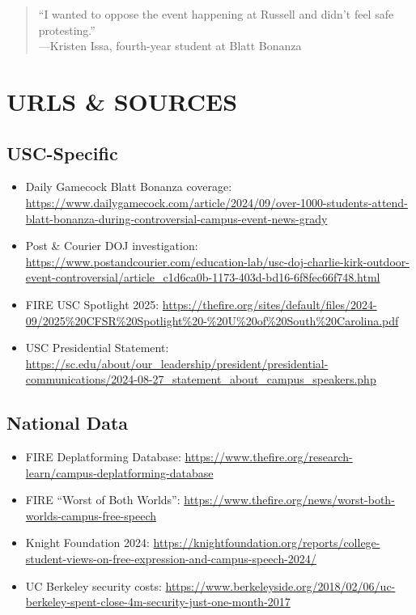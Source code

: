 \documentclass[11pt,letterpaper]{article}
\begin{document}
\begin{quote}
``I wanted to oppose the event happening at Russell and didn't feel safe protesting.''\\
---Kristen Issa, fourth-year student at Blatt Bonanza
\end{quote}

\section{URLS \& SOURCES}

\subsection{USC-Specific}
\begin{itemize}[noitemsep]
    \item Daily Gamecock Blatt Bonanza coverage: \url{https://www.dailygamecock.com/article/2024/09/over-1000-students-attend-blatt-bonanza-during-controversial-campus-event-news-grady}
    \item Post \& Courier DOJ investigation: \url{https://www.postandcourier.com/education-lab/usc-doj-charlie-kirk-outdoor-event-controversial/article_c1d6ca0b-1173-403d-bd16-6f8fec66f748.html}
    \item FIRE USC Spotlight 2025: \url{https://thefire.org/sites/default/files/2024-09/2025\%20CFSR\%20Spotlight\%20-\%20U\%20of\%20South\%20Carolina.pdf}
    \item USC Presidential Statement: \url{https://sc.edu/about/our_leadership/president/presidential-communications/2024-08-27_statement_about_campus_speakers.php}
\end{itemize}

\subsection{National Data}
\begin{itemize}[noitemsep]
    \item FIRE Deplatforming Database: \url{https://www.thefire.org/research-learn/campus-deplatforming-database}
    \item FIRE ``Worst of Both Worlds'': \url{https://www.thefire.org/news/worst-both-worlds-campus-free-speech}
    \item Knight Foundation 2024: \url{https://knightfoundation.org/reports/college-student-views-on-free-expression-and-campus-speech-2024/}
    \item UC Berkeley security costs: \url{https://www.berkeleyside.org/2018/02/06/uc-berkeley-spent-close-4m-security-just-one-month-2017}
\end{itemize}
\end{document}
